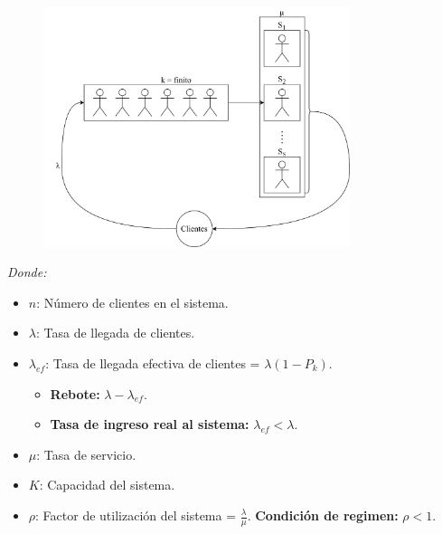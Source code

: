 \documentclass{templateNote}
\begin{document}
\begin{figure}[H]
    \centering
    \includegraphics[width=0.8\textwidth]{img/mm1k.png}
\end{figure}

\textit{Donde:}
\begin{itemize}
    \item $n$: Número de clientes en el sistema.
    \item $\lambda$: Tasa de llegada de clientes.
    \item $\lambda_{ef}$: Tasa de llegada efectiva de clientes = $\lambda(1-P_k)$.
    \begin{itemize}
        \item \textbf{Rebote:} $\lambda - \lambda_{ef}$. 
        \item \textbf{Tasa de ingreso real al sistema:} $\lambda_{ef}<\lambda$.
    \end{itemize}
    \item $\mu$: Tasa de servicio.
    \item $K$: Capacidad del sistema.
    \item $\rho$: Factor de utilización del sistema = $\frac{\lambda}{\mu}$. \textbf{Condición de regimen:} $\rho < 1$.
\end{itemize}
\end{document}
